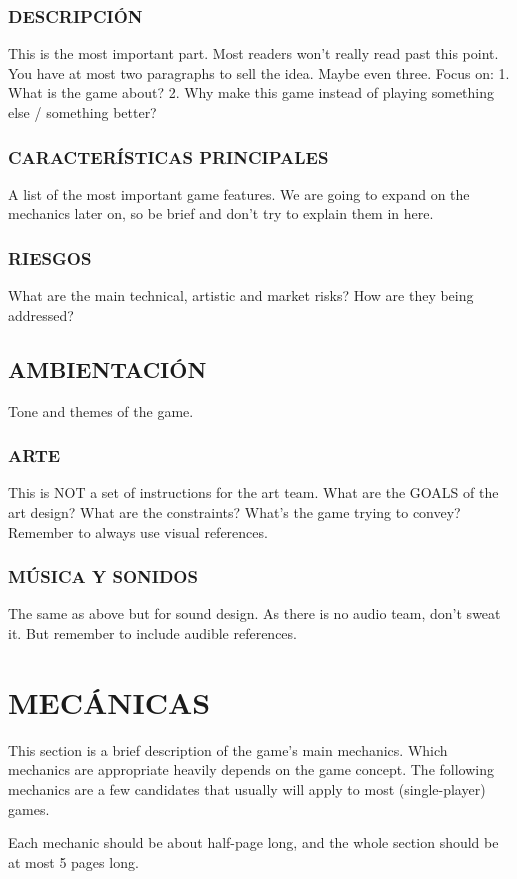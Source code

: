 \documentclass{article}
\begin{document}
    \subsubsection{DESCRIPCIÓN}
    This is the most important part. Most readers won’t really read past this point. You have at most two paragraphs to sell the idea. Maybe even three. Focus on:
    1. What is the game about?
    2. Why make this game instead of playing something else / something better?
    \subsubsection{CARACTERÍSTICAS PRINCIPALES}
    A list of the most important game features. We are going to expand on the mechanics later on, so be brief and don’t try to explain them in here.
    \subsubsection{RIESGOS}
    What are the main technical, artistic and market risks? How are they being addressed?


    \subsection{AMBIENTACIÓN}
    Tone and themes of the game.
    \subsubsection{ARTE}
    This is NOT a set of instructions for the art team. What are the GOALS of the art design? What are the constraints? What’s the game trying to convey? Remember to always use visual references.
    \subsubsection{MÚSICA Y SONIDOS}
    The same as above but for sound design. As there is no audio team, don’t sweat it. But remember to include audible references.  

    \newpage
    \section{MECÁNICAS}
    This section is a brief description of the game’s main mechanics. Which mechanics are appropriate heavily depends on the game concept. The following mechanics are a few candidates that usually will apply to most (single-player) games.

    Each mechanic should be about half-page long, and the whole section should be at most 5 pages long.
\end{document}

